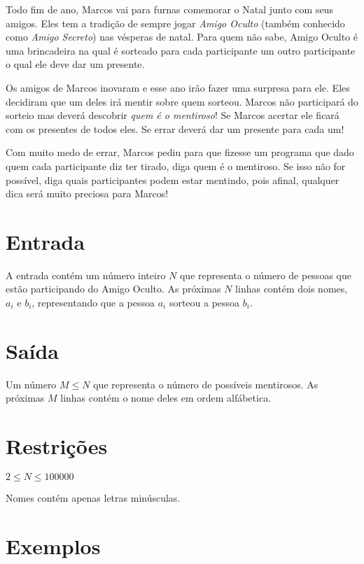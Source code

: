 Todo fim de ano, Marcos vai para furnas comemorar o Natal junto com seus amigos.
Eles tem a tradição de sempre jogar \textit{Amigo Oculto} (também conhecido como 
\textit{Amigo Secreto}) nas vésperas de natal. Para quem não sabe, Amigo Oculto
é uma brincadeira na qual é sorteado para cada participante um outro participante
o qual ele deve dar um presente. 

Os amigos de Marcos inovaram e esse ano irão fazer uma surpresa para ele. Eles decidiram
que um deles irá mentir sobre quem sorteou. Marcos não participará do sorteio mas
deverá descobrir \textit{quem é o mentiroso}! Se Marcos acertar ele ficará com os
presentes de todos eles. Se errar deverá dar um presente para cada um! 

Com muito medo de errar, Marcos pediu para que fizesse um programa que dado quem
cada participante diz ter tirado, diga quem é o mentiroso. Se isso não for possível,
diga quais participantes podem estar mentindo, pois afinal, qualquer dica será
muito preciosa para Marcos!

\section*{Entrada}

A entrada contém um número inteiro $N$ que representa o número de pessoas que estão
participando do Amigo Oculto. As próximas $N$ linhas contém dois nomes, $a_i$ e $b_i$,
representando que a pessoa $a_i$ sorteou a pessoa $b_i$.

\section*{Saída}

Um número $M \le N$ que representa o número de possíveis mentirosos. As próximas $M$ linhas
contém o nome deles em ordem alfábetica.

\section*{Restrições}

$2 \le N \le 100000$

Nomes contém apenas letras minúsculas. 

\section*{Exemplos}

\exemplo

